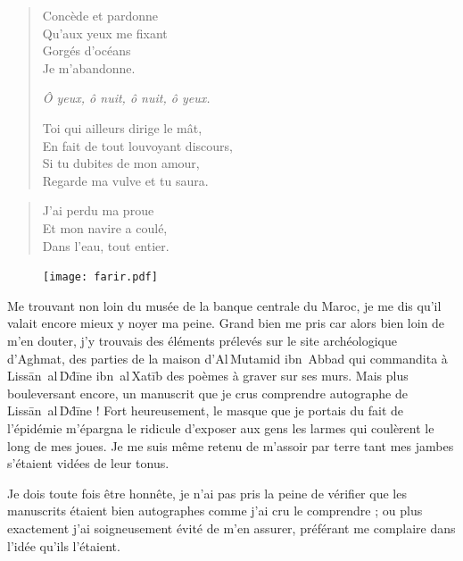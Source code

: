 \begin{verse}
  Concède et pardonne\\  %
  Qu’aux yeux me fixant\\  %
  Gorgés d’océans\\  %
  Je m’abandonne.

  \emph{Ô yeux, ô nuit, ô nuit, ô yeux.}

  Toi qui ailleurs dirige le mât,\\  %
  En fait de tout louvoyant discours,\\  %
  Si tu dubites de mon amour,\\  %
  Regarde ma vulve et tu saura.
\end{verse}

\begin{verse}%
  \haiku
  J’ai perdu ma proue\\  %
  Et mon navire a coulé,\\  %
  Dans l’eau, tout entier.
\end{verse}

\begin{figure}[h]
  \centering
  \texttt{[image: farir.pdf]}
  \captionsetup{labelformat=empty}
  \caption[Idéotexte du  (\textarabic{خالي})]{}
\end{figure}

\begin{prose}
  Me trouvant non loin du musée de la banque centrale du Maroc, je me dis qu’il valait encore mieux y noyer ma peine. Grand bien me pris car alors  bien loin de m’en douter, j’y trouvais des éléments prélevés sur le site archéologique d’Aghmat, des parties de la maison d’Al\,Mutamid ibn~Abbad qui commandita à Lissān~al\,Ḋḋīne ibn~al\,Xatīb des poèmes à graver sur ses murs. Mais plus bouleversant encore, un manuscrit que je crus comprendre autographe de Lissān~al\,Ḋḋīne ! Fort heureusement, le masque que je portais du fait de l’épidémie m’épargna le ridicule d’exposer aux gens les larmes qui coulèrent le long de mes joues. Je me suis même retenu de m’assoir par terre tant mes jambes s’étaient vidées de leur tonus.

  Je dois toute fois être honnête, je n’ai pas pris la peine de vérifier que les manuscrits étaient bien autographes comme j’ai cru le comprendre ; ou plus exactement j’ai soigneusement évité de m’en assurer, préférant me complaire dans l’idée qu’ils l’étaient.
\end{prose}

